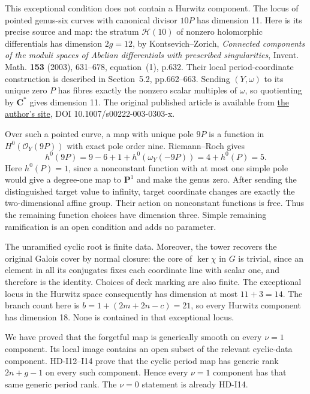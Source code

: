 This exceptional condition does not contain a Hurwitz component.
The locus of pointed genus-six curves with canonical divisor
$10P$ has dimension 11. Here is its precise source and map:
the stratum $\mathcal H(10)$ of nonzero holomorphic
differentials has dimension $2g=12$, by Kontsevich--Zorich,
\emph{Connected components of the moduli spaces of Abelian
differentials with prescribed singularities}, Invent. Math.
\textbf{153} (2003), 631--678, equation~(1), p.632.
Their local period-coordinate construction is described in
Section~5.2, pp.662--663. Sending $(Y,\omega)$ to its unique
zero $P$ has fibres exactly the nonzero scalar multiples of
$\omega$, so quotienting by $\mathbf C^*$ gives dimension 11.
The original published article is available from
\href{https://webusers.imj-prg.fr/~anton.zorich/Papers/KontsevichZorich_Inventiones.pdf}
{the author's site}, DOI 10.1007/s00222-003-0303-x.

Over such a pointed curve, a map with unique pole $9P$ is a
function in $H^0(\mathcal O_Y(9P))$ with exact pole order nine.
Riemann--Roch gives
\[
 h^0(9P)=9-6+1+h^0(\omega_Y(-9P))
        =4+h^0(P)=5.
\]
Here $h^0(P)=1$, since a nonconstant function with at most one
simple pole would give a degree-one map to $\mathbf P^1$ and
make the genus zero. After sending the distinguished target
value to infinity, target coordinate changes are exactly the
two-dimensional affine group. Their action on nonconstant
functions is free. Thus the remaining function choices have
dimension three. Simple remaining ramification is an open
condition and adds no parameter.

The unramified cyclic root is finite data. Moreover, the tower
recovers the original Galois cover by normal closure: the core
of $\ker\chi$ in $G$ is trivial, since an element in all its
conjugates fixes each coordinate line with scalar one, and
therefore is the identity. Choices of deck marking are also
finite. The exceptional locus in the Hurwitz space consequently
has dimension at most $11+3=14$. The branch count here is
$b=1+(2m+2n-c)=21$, so every Hurwitz component has dimension
18. None is contained in that exceptional locus.

We have proved that the forgetful map is generically smooth on
every $\nu=1$ component. Its local image contains an open subset
of the relevant cyclic-data component. HD-I12--I14 prove that
the cyclic period map has generic rank $2n+g-1$ on every such
component. Hence every $\nu=1$ component has that same generic
period rank. The $\nu=0$ statement is already HD-I14.

